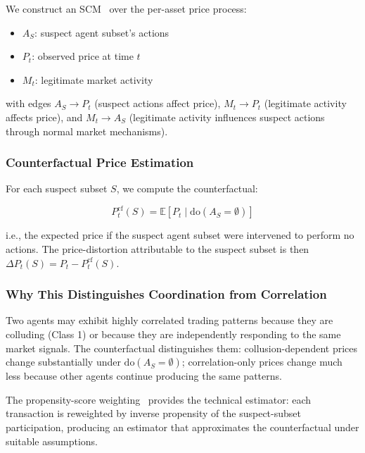 \documentclass[sigconf,nonacm]{acmart}
\begin{document}
We construct an SCM~\cite{pearl2009causality} over the per-asset
price process:

\begin{itemize}
  \item $A_S$: suspect agent subset's actions
  \item $P_t$: observed price at time $t$
  \item $M_t$: legitimate market activity
\end{itemize}

with edges $A_S \to P_t$ (suspect actions affect price), $M_t \to
P_t$ (legitimate activity affects price), and $M_t \to A_S$
(legitimate activity influences suspect actions through normal
market mechanisms).

\subsubsection{Counterfactual Price Estimation}

For each suspect subset $S$, we compute the counterfactual:

\begin{equation}
  P_t^{\text{cf}}(S) = \mathbb{E}[P_t \mid \text{do}(A_S = \emptyset)]
\end{equation}

i.e., the expected price if the suspect agent subset were intervened
to perform no actions. The price-distortion attributable to the
suspect subset is then $\Delta P_t(S) = P_t - P_t^{\text{cf}}(S)$.

\subsubsection{Why This Distinguishes Coordination from Correlation}

Two agents may exhibit highly correlated trading patterns because
they are colluding (Class 1) or because they are independently
responding to the same market signals. The counterfactual
distinguishes them: collusion-dependent prices change substantially
under $\text{do}(A_S = \emptyset)$; correlation-only prices change
much less because other agents continue producing the same patterns.

The propensity-score weighting~\cite{rosenbaum1983propensity}
provides the technical estimator: each transaction is reweighted by
inverse propensity of the suspect-subset participation, producing
an estimator that approximates the counterfactual under suitable
assumptions.
\end{document}
